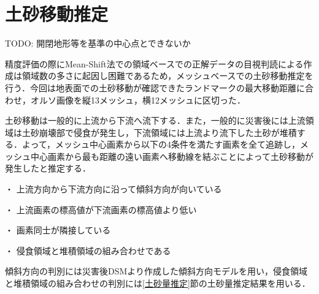   \section{土砂移動推定}
    \label{土砂移動推定}
      TODO: 開閉地形等を基準の中心点とできないか

    精度評価の際にMean-Shift法での領域ベースでの正解データの目視判読による作成は領域数の多さに起因し困難であるため，メッシュベースでの土砂移動推定を行う．今回は地表面での土砂移動が確認できたランドマークの最大移動距離に合わせ，オルソ画像を縦13メッシュ，横12メッシュに区切った．

    土砂移動は一般的に上流から下流へ流下する．また，一般的に災害後には上流領域は土砂崩壊部で侵食が発生し，下流領域には上流より流下した土砂が堆積する．よって，メッシュ中心画素から以下の4条件を満たす画素を全て追跡し，メッシュ中心画素から最も距離の遠い画素へ移動線を結ぶことによって土砂移動が発生したと推定する．

    ・	上流方向から下流方向に沿って傾斜方向が向いている

    ・	上流画素の標高値が下流画素の標高値より低い
    
    ・	画素同士が隣接している
    
    ・	侵食領域と堆積領域の組み合わせである

    傾斜方向の判別には災害後DSMより作成した傾斜方向モデルを用い，侵食領域と堆積領域の組み合わせの判別には\ref{土砂量推定}節の土砂量推定結果を用いる．
  

